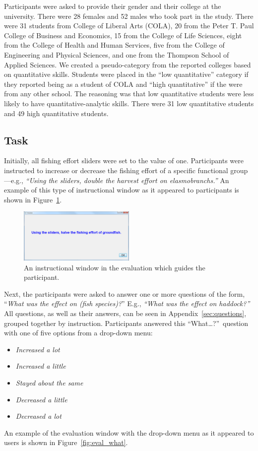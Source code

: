 Participants were asked to provide their gender and their college at the university.  There were 28 females and 52 males who took part in the study.  There were 31 students from College of Liberal Arts (COLA), 20 from the Peter T. Paul College of Business and Economics, 15 from the College of Life Sciences, eight from the College of Health and Human Services, five from the College of Engineering and Physical Sciences, and one from the Thompson School of Applied Sciences.  We created a pseudo-category from the reported colleges based on quantitative skills.  Students were placed in the ``low quantitative'' category if they reported being as a student of COLA and ``high quantitative'' if the were from any other school.  The reasoning was that low quantitative students were less likely to have quantitative-analytic skills.  There were 31 low quantitative students and 49 high quantitative students.

\subsection{Task}

Initially, all fishing effort sliders were set to the value of one.  Participants were instructed to increase or decrease the fishing effort of a specific functional group---e.g., \textit{``Using the sliders, double the harvest effort on elasmobranchs.''}  An example of this type of instructional window as it appeared to participants is shown in Figure~\ref{fig:eval_inst}.

\begin{figure}[h]
	\centering
	\includegraphics[width=0.5\textwidth]{figures/png/eval_instr.png}
	\caption[An instructional window in the evaluation which guides the participant]{An instructional window in the evaluation which guides the participant.}
	\label{fig:eval_inst}
\end{figure}

Next, the participants were asked to answer one or more questions of the form, ``\textit{What was the effect on (fish species)?}''  E.g., \textit{``What was the effect on haddock?''}  All questions, as well as their answers, can be seen in Appendix~\ref{sec:questions}, grouped together by instruction.  Participants answered this ``What\ldots?''\ question with one of five options from a drop-down menu:
\begin{itemize}
\item \textit{Increased a lot}
\item \textit{Increased a little}
\item \textit{Stayed about the same}
\item \textit{Decreased a little}
\item \textit{Decreased a lot}
\end{itemize}
An example of the evaluation window with the drop-down menu as it appeared to users is shown in Figure~\ref{fig:eval_what}.

